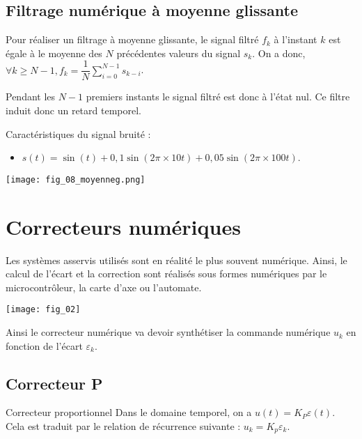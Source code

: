 \subsection{Filtrage numérique à moyenne glissante} 
Pour réaliser un filtrage à moyenne glissante, le signal filtré $f_k$ à l'instant $k$ est égale à le moyenne des $N$ précédentes valeurs du signal $s_k$. On a donc, $\forall k \geq N-1, f_k = \dfrac{1}{N}\sum\limits_{i=0}^{N-1} s_{k-i}$.

Pendant les $N-1$ premiers instants le signal filtré est donc à l'état nul. Ce filtre induit donc un retard temporel.

\begin{minipage}[c]{.48\linewidth}
Caractéristiques du signal bruité :
\begin{itemize}
\item $s(t)=\sin(t) + 0,1\sin(2\pi \times 10 t)+ 0,05\sin(2\pi \times 100 t)$.
\end{itemize}
\end{minipage}
\begin{minipage}[c]{.48\linewidth}
\begin{center}
\texttt{[image: fig\_08\_moyenneg.png]}
\end{center}
\end{minipage}

\section{Correcteurs numériques}
 
 Les systèmes asservis utilisés sont en réalité le plus souvent numérique. Ainsi, le calcul de l'écart et la correction sont 
 réalisés sous formes numériques par le microcontrôleur, la carte d'axe ou l'automate. 
 
 \begin{center}
\texttt{[image: fig\_02]}
\end{center}

Ainsi le correcteur numérique va devoir synthétiser la commande numérique $u_k$ en fonction de l'écart $\varepsilon_k$. 


 
\subsection{Correcteur P}
\begin{defi}{Correcteur proportionnel}
Dans le domaine temporel, on a $u(t)=K_P \varepsilon(t)$. Cela est traduit par le relation de récurrence suivante : 
$u_k = K_p \varepsilon_k$.
\end{defi}
